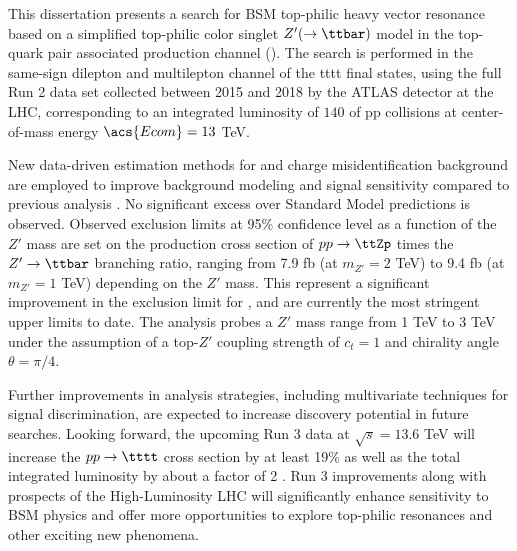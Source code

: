 \documentclass[../thesis.tex]{subfiles}
\begin{document}
\vspace{-1\baselineskip}

This dissertation presents a search for \acs{BSM} top-philic heavy vector resonance based on a simplified top-philic color singlet $Z'(\rightarrow\ttbar)$ model in the top-quark pair associated production channel (\ttZp). The search is performed in the same-sign dilepton and multilepton channel of the \acs{tttt} final states, using the full Run 2 data set collected between 2015 and 2018 by the \acs{ATLAS} detector at the \acs{LHC}, corresponding to an integrated luminosity of $140$ \fb of \acs{pp} collisions at center-of-mass energy $\acs{Ecom}=13$ TeV.

New data-driven estimation methods for \ttW and charge misidentification background are employed to improve background modeling and signal sensitivity compared to previous analysis \citep{theory:ttZp_1los}. No significant excess over Standard Model predictions is observed. Observed exclusion limits at 95\% confidence level as a function of the $Z'$ mass are set on the production cross section of $pp\rightarrow\ttZp$ times the $Z'\rightarrow\ttbar$ branching ratio, ranging from 7.9 fb (at $m_{Z'}=2$ TeV) to 9.4 fb (at $m_{Z'}=1$ TeV) depending on the $Z'$ mass. This represent a significant improvement in the exclusion limit for \ttZp \citep{theory:ttZp_1los}, and are currently the most stringent upper limits to date. The analysis probes a $Z'$ mass range from 1 TeV to 3 TeV under the assumption of a top-$Z'$ coupling strength of $c_t=1$ and chirality angle $\theta=\pi/4$.

Further improvements in analysis strategies, including multivariate techniques for signal discrimination, are expected to increase discovery potential in future searches. Looking forward, the upcoming Run 3 data at $\sqrt{s} = 13.6$ TeV will increase the $pp\rightarrow\tttt$ cross section by at least 19\% \citep{PhysRevLett.131.211901} as well as the total integrated luminosity by about a factor of 2 \citep{ATL-DAPR-PUB-2023-001}. Run 3 improvements along with prospects of the High-Luminosity \acs{LHC} will significantly enhance sensitivity to \acs{BSM} physics and offer more opportunities to explore top-philic resonances and other exciting new phenomena. 
\end{document}
